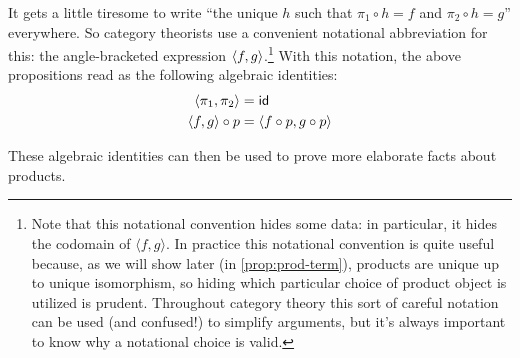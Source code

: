 It gets a little tiresome to write ``the unique \(h\) such that \(\pi_1 \circ h = f\)
and \(\pi_2 \circ h = g\)'' everywhere.
So category theorists use a convenient notational abbreviation
for this: the angle-bracketed expression \(\langle f,g\rangle\).\footnote{Note that 
this notational convention hides some data: in particular, 
it hides the codomain of $\langle f, g \rangle$. In practice this notational convention is quite useful 
because, as we will show later (in \cref{prop:prod-term}), products are 
unique up to unique isomorphism, so hiding which particular choice of 
product object is utilized is prudent. Throughout category theory this 
sort of careful notation can be used (and confused!) to simplify arguments, but 
it's always important to know why a notational choice is valid.}
With this notation, the above propositions read as the following
algebraic identities:
\begin{align}
  \label{eq:id_eq_tupling}
  \angled{\pi_1,\pi_2} &= \idt \\
  \angled{f,g}\circ p &= \angled{f\circ p, g \circ p}
\end{align}

These algebraic identities can then be used to prove more elaborate facts about
products.


